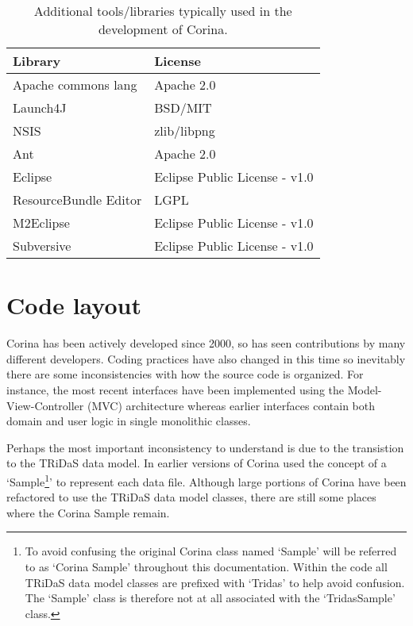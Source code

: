 \begin{table*}[htbp]
\centering
\label{tbl:developDependencies}
\begin{tabular*}{0.6\textwidth}{ll}
\toprule
Library & License \\
\midrule
Apache commons lang & Apache 2.0 \\
Launch4J & BSD/MIT \\
NSIS & zlib/libpng \\
Ant & Apache 2.0 \\
Eclipse & Eclipse Public License - v1.0\\
ResourceBundle Editor & LGPL \\
M2Eclipse & Eclipse Public License - v1.0\\
Subversive & Eclipse Public License - v1.0\\
\bottomrule
\end{tabular*}
\captionsetup{width=0.6\textwidth}
\caption{Additional tools/libraries typically used in the development of Corina.}
\end{table*}



\section{Code layout}
Corina has been actively developed since 2000, so has seen contributions by many different developers.  Coding practices have also changed in this time so inevitably there are some inconsistencies with how the source code is organized.  For instance, the most recent interfaces have been implemented using the Model-View-Controller (MVC) architecture whereas earlier interfaces contain both domain and user logic in single monolithic classes.  

Perhaps the most important inconsistency to understand is due to the transistion to the TRiDaS data model.  In earlier versions of Corina used the concept of a `Sample\footnote{To avoid confusing the original Corina class named `Sample' will be referred to as `Corina Sample' throughout this documentation.  Within the code all TRiDaS data model classes are prefixed with `Tridas' to help avoid confusion.  The `Sample' class is therefore not at all associated with the `TridasSample' class.}' to represent each data file.  Although large portions of Corina have been refactored to use the TRiDaS data model classes, there are still some places where the Corina Sample remain.  

